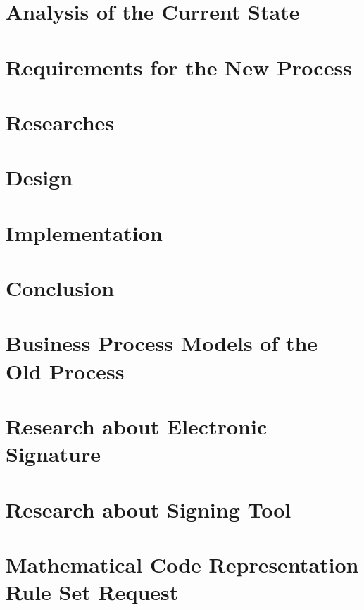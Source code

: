 	\chapter{Analysis of the Current State}
	\label{ch:analysis}
	
	
	\chapter{Requirements for the New Process}
	
	
	\chapter{Researches}
	
	
	\chapter{Design}
	
	
	\chapter{Implementation}
	
	
	\chapter{Conclusion}
	
	
	\printbibliography
	
	\clearpage
	\appendix
	\chapter{Business Process Models of the Old Process}
	\label{bpmnOld}
	
	
	\chapter{Research about Electronic Signature}
	\label{res:es}
	
	
	\chapter{Research about Signing Tool}
	\label{res:tool}
	
	
	\chapter{Mathematical Code Representation Rule Set Request}
	\label{mathCode}
		
	
